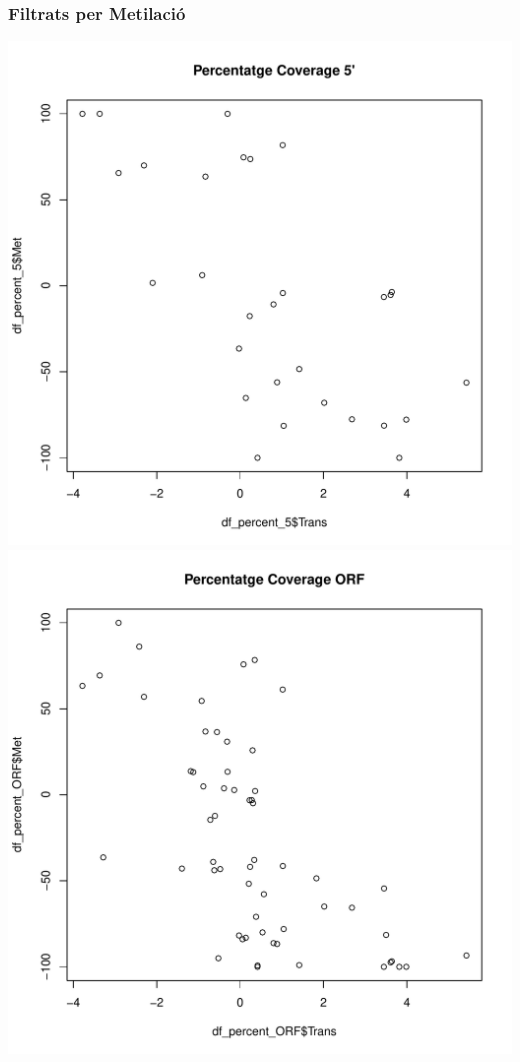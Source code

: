 \documentclass{article}\usepackage[]{graphicx}\usepackage[]{color}
\makeatletter
\def\maxwidth{ %
  \ifdim\Gin@nat@width>\linewidth
    \linewidth
  \else
    \Gin@nat@width
  \fi
}
\newenvironment{knitrout}{}{} %
\makeatother
\begin{document}
\subsubsection{Filtrats per Metilació}
\begin{knitrout}
\color{fgcolor}

{\centering \includegraphics[width=\maxwidth]{figure/minimal-correlacions_met-1} 
\includegraphics[width=\maxwidth]{figure/minimal-correlacions_met-2} 
}
\end{knitrout}
\end{document}
